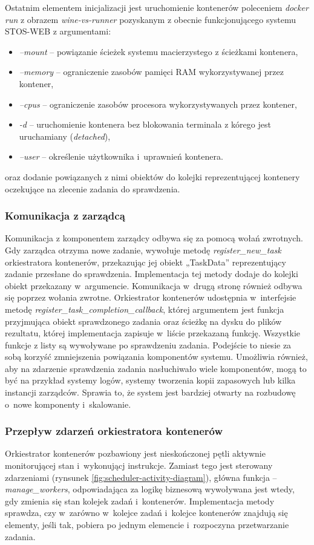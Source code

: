 Ostatnim elementem inicjalizacji jest uruchomienie kontenerów poleceniem \textit{docker run} z obrazem \textit{wine-vs-runner} pozyskanym z obecnie funkcjonującego systemu STOS-WEB z argumentami:
\begin{itemize}
    \item \textit{--mount} -- powiązanie ścieżek systemu macierzystego z ścieżkami kontenera,
    \item \textit{--memory} -- ograniczenie zasobów pamięci RAM wykorzystywanej przez kontener,
    \item \textit{--cpus} -- ograniczenie zasobów procesora wykorzystywanych przez kontener,
    \item \textit{-d} -- uruchomienie kontenera bez blokowania terminala z kórego jest uruchamiany (\textit{detached}),
    \item \textit{--user} -- określenie użytkownika i~uprawnień kontenera.
\end{itemize}
oraz dodanie powiązanych z nimi obiektów do kolejki reprezentującej kontenery oczekujące na zlecenie zadania do sprawdzenia.

\subsubsection{Komunikacja z zarządcą}
Komunikacja z komponentem zarządcy odbywa się za pomocą wołań zwrotnych. Gdy zarządca otrzyma nowe zadanie, wywołuje metodę \textit{register\_new\_task} orkiestratora kontenerów, przekazując jej obiekt „TaskData” reprezentujący zadanie przesłane do sprawdzenia. Implementacja tej metody dodaje do kolejki obiekt przekazany w~argumencie. Komunikacja w~drugą stronę również odbywa się poprzez wołania zwrotne. Orkiestrator kontenerów udostępnia w~interfejsie metodę \textit{register\_task\_completion\_callback}, której argumentem jest funkcja przyjmująca obiekt sprawdzonego zadania oraz ścieżkę na dysku do plików rezultatu, której implementacja zapisuje w~liście przekazaną funkcję. Wszystkie funkcje z listy są wywoływane po sprawdzeniu zadania. Podejście to niesie za sobą korzyść zmniejszenia powiązania komponentów systemu. Umożliwia również, aby na zdarzenie sprawdzenia zadania nasłuchiwało wiele komponentów, mogą to być na przykład systemy logów, systemy tworzenia kopii zapasowych lub kilka instancji zarządców. Sprawia to, że system jest bardziej otwarty na rozbudowę o~nowe komponenty i~skalowanie.

\subsubsection{Przepływ zdarzeń orkiestratora kontenerów}
Orkiestrator kontenerów pozbawiony jest nieskończonej pętli aktywnie monitorującej stan i~wykonującj instrukcje. Zamiast tego jest sterowany zdarzeniami (rynsunek \ref{fig:scheduler-activity-diagram}), główna funkcja -- \textit{manage\_workers}, odpowiadająca za logikę biznesową wywoływana jest wtedy, gdy zmienia się stan kolejek zadań i~kontenerów. Implementacja metody sprawdza, czy w~zarówno w~kolejce zadań i~kolejce kontenerów znajdują się elementy, jeśli tak, pobiera po jednym elemencie i~rozpoczyna przetwarzanie zadania.

